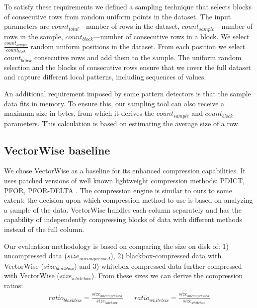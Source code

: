 To satisfy these requirements we defined a sampling technique that selects blocks of consecutive rows from random uniform points in the dataset. The input parameters are \(count_{total}\)---number of rows in the dataset, \(count_{sample}\)---number of rows in the sample, \(count_{block}\)---number of consecutive rows in a block. We select \(\frac{count_{sample}}{count_{block}}\) random uniform positions in the dataset. From each position we select \(count_{block}\) consecutive rows and add them to the sample. The uniform random selection and the blocks of consecutive rows ensure that we cover the full dataset and capture different local patterns, including sequences of values.

An additional requirement imposed by some pattern detectors is that the sample data fits in memory. To ensure this, our sampling tool can also receive a maximum size in bytes, from which it derives the \(count_{sample}\) and \(count_{block}\) parameters. This calculation is based on estimating the average size of a row.




\subsection{VectorWise baseline}
\label{subsec:eval:methodology:vectorwise}

We chose VectorWise as a baseline for its enhanced compression capabilities. It uses patched versions of well known lightweight compression methods: PDICT, PFOR, PFOR-DELTA \cite{zukowski2006super}. The compression engine is similar to ours to some extent: the decision upon which compression method to use is based on analyzing a sample of the data. VectorWise handles each column separately and has the capability of independently compressing blocks of data with different methods instead of the full column.


Our evaluation methodology is based on comparing the size on disk of: 1) uncompressed data (\(size_{uncompressed}\)), 2) blackbox-compressed data with VectorWise (\(size_{blackbox}\)) and 3) whitebox-compressed data further compressed with VectorWise (\(size_{whitebox}\)). From these sizes we can derive the compression ratios:
\begin{align}
\label{eq:eval:vectorwise:ratios}
    \mathit{ratio_{blackbox}} = \frac{size_{uncompressed}}{size_{blackbox}} && 
    \mathit{ratio_{whitebox}} = \frac{size_{uncompressed}}{size_{whitebox}}
\end{align}


